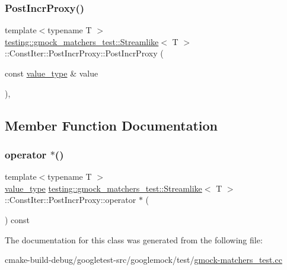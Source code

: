 \subsubsection{\texorpdfstring{PostIncrProxy()}{PostIncrProxy()}}
{\footnotesize\ttfamily template$<$typename T $>$ \\
\mbox{\hyperlink{classtesting_1_1gmock__matchers__test_1_1Streamlike}{testing\+::gmock\+\_\+matchers\+\_\+test\+::\+Streamlike}}$<$ T $>$\+::Const\+Iter\+::\+Post\+Incr\+Proxy\+::\+Post\+Incr\+Proxy (\begin{DoxyParamCaption}\item[{const \mbox{\hyperlink{classtesting_1_1gmock__matchers__test_1_1Streamlike_a7e2c2e021676c1ed5dea63cdd019661c}{value\+\_\+type}} \&}]{value }\end{DoxyParamCaption})\hspace{0.3cm}{\ttfamily [inline]}, {\ttfamily [explicit]}}



\subsection{Member Function Documentation}
\mbox{\label{classtesting_1_1gmock__matchers__test_1_1Streamlike_1_1ConstIter_1_1PostIncrProxy_a8b1cf42698f3315e9d8c65891bfeb8d7}} 
\subsubsection{\texorpdfstring{operator $\ast$()}{operator *()}}
{\footnotesize\ttfamily template$<$typename T $>$ \\
\mbox{\hyperlink{classtesting_1_1gmock__matchers__test_1_1Streamlike_a7e2c2e021676c1ed5dea63cdd019661c}{value\+\_\+type}} \mbox{\hyperlink{classtesting_1_1gmock__matchers__test_1_1Streamlike}{testing\+::gmock\+\_\+matchers\+\_\+test\+::\+Streamlike}}$<$ T $>$\+::Const\+Iter\+::\+Post\+Incr\+Proxy\+::operator $\ast$ (\begin{DoxyParamCaption}{ }\end{DoxyParamCaption}) const\hspace{0.3cm}{\ttfamily [inline]}}



The documentation for this class was generated from the following file\+:\begin{DoxyCompactItemize}
\item 
cmake-\/build-\/debug/googletest-\/src/googlemock/test/\mbox{\hyperlink{gmock-matchers__test_8cc}{gmock-\/matchers\+\_\+test.\+cc}}\end{DoxyCompactItemize}
